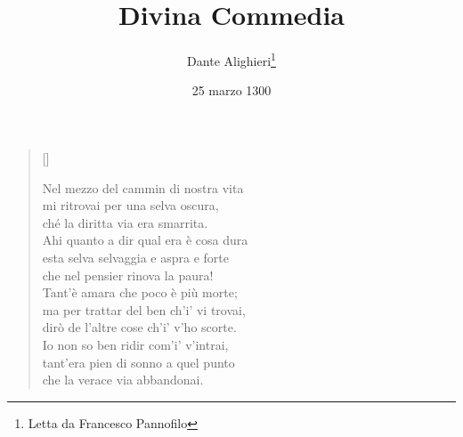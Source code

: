 \documentclass{article}
\title{Divina Commedia}
\author{Dante Alighieri\thanks{Letta da Francesco Pannofilo}}
\date{25 marzo 1300}
\begin{document}
\large

\maketitle

\settowidth{\versewidth}{Nel mezzo del cammin di nostra vita}

\begin{verse}[\versewidth]
  \begin{patverse*}
    Nel mezzo del cammin di nostra vita\\
    mi ritrovai per una selva oscura,\\
    ché la diritta via era smarrita.\\
    Ahi quanto a dir qual era è cosa dura\\
    esta selva selvaggia e aspra e forte\\
    che nel pensier rinova la paura!\\
    Tant'è amara che poco è più morte;\\
    ma per trattar del ben ch'i' vi trovai,\\
    dirò de l'altre cose ch'i' v'ho scorte.\\
    Io non so ben ridir com'i' v'intrai,\\
    tant'era pien di sonno a quel punto\\
    che la verace via abbandonai.
  \end{patverse*}
\end{verse}
\end{document}
